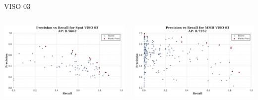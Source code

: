 \begin{frame}{VISO 03}
    \begin{columns}
        \begin{column}{0.5\textwidth}
            \centering
            \includegraphics[width=\textwidth,keepaspectratio]{images/bom/precision_recall_Spot_VISO_03.png}
        \end{column}
        \begin{column}{0.5\textwidth}
            \centering
            \includegraphics[width=\textwidth,keepaspectratio]{images/bom/precision_recall_MMB_VISO_03.png}
        \end{column}
    \end{columns}
\end{frame}

